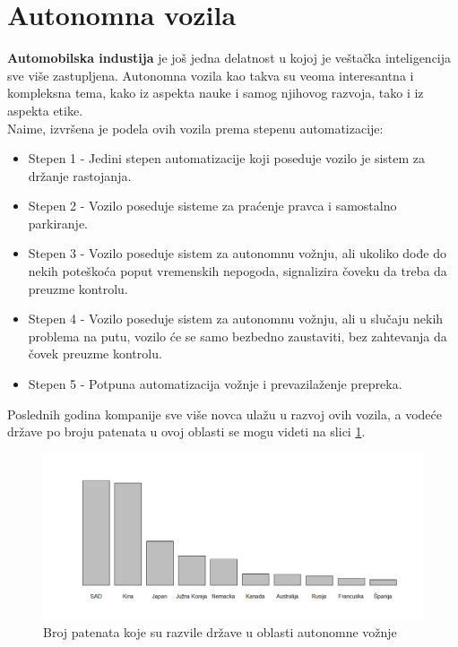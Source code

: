 \documentclass[a4paper]{article}
\begin{document}

\section{Autonomna vozila}
\label{sec:Autonomna vozila}
\textbf{Automobilska industija} je još jedna delatnost u kojoj je veštačka inteligencija sve više zastupljena. Autonomna vozila kao takva su veoma interesantna i kompleksna tema, kako iz aspekta nauke i samog njihovog razvoja, tako i iz aspekta etike. \\
Naime, izvršena je podela ovih vozila prema stepenu automatizacije:
\begin{itemize}
 \item {Stepen 1 - Jedini stepen automatizacije koji poseduje vozilo je sistem za           držanje rastojanja.}
 \item {Stepen 2 - Vozilo poseduje sisteme za praćenje pravca i samostalno                  parkiranje.}
 \item {Stepen 3 - Vozilo poseduje sistem za autonomnu vožnju, ali ukoliko dođe do          nekih poteškoća poput vremenskih nepogoda, signalizira čoveku da treba da         preuzme kontrolu.}
 \item {Stepen 4 - Vozilo poseduje sistem za autonomnu vožnju, ali u slučaju nekih              problema na putu, vozilo će se samo bezbedno zaustaviti, bez zahtevanja da        čovek preuzme kontrolu.}
 \item {Stepen 5 - Potpuna automatizacija vožnje i prevazilaženje prepreka.}
\end{itemize} 
Poslednih godina kompanije sve više novca ulažu u razvoj ovih vozila, a vodeće države po broju patenata u ovoj oblasti se mogu videti na slici \ref{fig:histograma}.

\begin{figure}[h!]
\begin{center}
\includegraphics[scale=0.41]{slika.png}
\end{center}
\caption{Broj patenata koje su razvile države u oblasti autonomne vožnje \cite{vehicle_data}} 
\label{fig:histograma}
\end{figure} 
\end{document}
